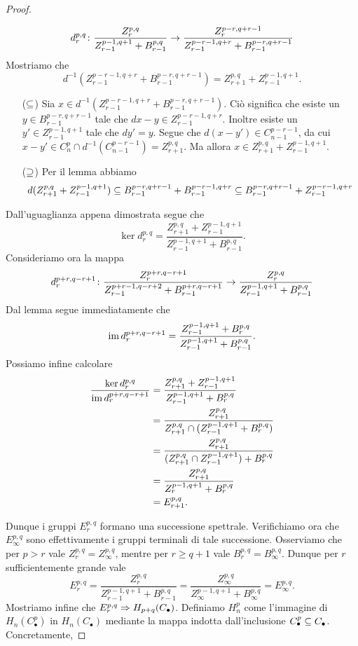 \begin{proof}
\begin{enumerate}
$$
d^{p,q}_r\colon\frac{Z^{p,q}_r}{Z^{p-1,q+1}_{r-1}+B^{p,q}_{r-1}}\to\frac{Z^{p-r,q+r-1}_r}{Z^{p-r-1,q+r}_{r-1}+B^{p-r,q+r-1}_{r-1}}
$$
Mostriamo che 
$$
d^{-1}(Z^{p-r-1,q+r}_{r-1}+B^{p-r,q+r-1}_{r-1})=Z^{p,q}_{r+1}+Z^{p-1,q+1}_{r-1}.
$$
\begin{itemize}
\item[($\subseteq$)] Sia $x\in d^{-1}(Z^{p-r-1,q+r}_{r-1}+B^{p-r,q+r-1}_{r-1})$. Ciò significa che esiste un $y\in B^{p-r,q+r-1}_{r-1}$ tale che $dx-y\in Z^{p-r-1,q+r}_{r-1}$. Inoltre esiste un $y'\in Z^{p-1,q+1}_{r-1}$ tale che $dy'=y$. Segue che $d(x-y')\in C^{p-r-1}_{n-1}$, da cui $x-y'\in C^p_n\cap d^{-1}(C^{p-r-1}_{n-1})=Z^{p,q}_{r+1}$. Ma allora $x\in Z^{p,q}_{r+1}+Z^{p-1,q+1}_{r-1}$.
\item[($\supseteq$)] Per il lemma abbiamo
$$
d(Z^{p,q}_{r+1}+Z^{p-1,q+1}_{r-1})\subseteq B^{p-r,q+r-1}_{r-1}+B^{p-r-1,q+r}_{r-1}\subseteq B^{p-r,q+r-1}_{r-1}+Z^{p-r-1,q+r}_{r-1}
$$
\end{itemize}
Dall'uguaglianza appena dimostrata segue che
$$
\ker d^{p,q}_r=\frac{Z^{p,q}_{r+1}+Z^{p-1,q+1}_{r-1}}{Z^{p-1,q+1}_{r-1}+B^{p,q}_{r-1}}.
$$
Consideriamo ora la mappa
$$
d^{p+r,q-r+1}_r\colon\frac{Z^{p+r,q-r+1}_r}{Z^{p+r-1,q-r+2}_{r-1}+B^{p+r,q-r+1}_{r-1}}\to\frac{Z^{p,q}_r}{Z^{p-1,q+1}_{r-1}+B^{p,q}_{r-1}}
$$
Dal lemma segue immediatamente che
$$
\operatorname{im} d^{p+r,q-r+1}_r=\frac{Z^{p-1,q+1}_{r-1}+B^{p,q}_r}{Z^{p-1,q+1}_{r-1}+B^{p,q}_{r-1}}.
$$
Possiamo infine calcolare
\begin{align*}
\frac{\ker d^{p,q}_r}{\operatorname{im} d^{p+r,q-r+1}_r}&=\frac{Z^{p,q}_{r+1}+Z^{p-1,q+1}_{r-1}}{Z^{p-1,q+1}_{r-1}+B^{p,q}_r}\\
&=\frac{Z^{p,q}_{r+1}}{Z^{p,q}_{r+1}\cap(Z^{p-1,q+1}_{r-1}+B^{p,q}_r)}\\
&=\frac{Z^{p,q}_{r+1}}{(Z^{p,q}_{r+1}\cap Z^{p-1,q+1}_{r-1})+B^{p,q}_r}\\
&=\frac{Z^{p,q}_{r+1}}{Z^{p-1,q+1}_r+B^{p,q}_r}\\
&=E^{p,q}_{r+1}.
\end{align*}
\end{enumerate}
Dunque i gruppi $E^{p,q}_r$ formano una successione spettrale. Verifichiamo ora che $E^{p,q}_\infty$ sono effettivamente i gruppi terminali di tale successione. Osserviamo che per $p>r$ vale $Z^{p,q}_r=Z^{p,q}_\infty$, mentre per $r\ge q+1$ vale $B^{p,q}_r=B^{p,q}_\infty$. Dunque per $r$ sufficientemente grande vale
$$
E^{p,q}_r=\frac{Z^{p,q}_r}{Z^{p-1,q+1}_{r-1}+B^{p,q}_{r-1}}=\frac{Z^{p,q}_\infty}{Z^{p-1,q+1}_{\infty}+B^{p,q}_\infty}=E^{p,q}_\infty.
$$
Mostriamo infine che $E^{p,q}_r\Rightarrow H_{p+q}(C_\bullet)$. Definiamo $H^p_n$ come l'immagine di $H_n(C^p_\bullet)$ in $H_n(C_\bullet)$ mediante la mappa indotta dall'inclusione $C^p_\bullet\subseteq C_\bullet$. Concretamente,

\end{proof}

